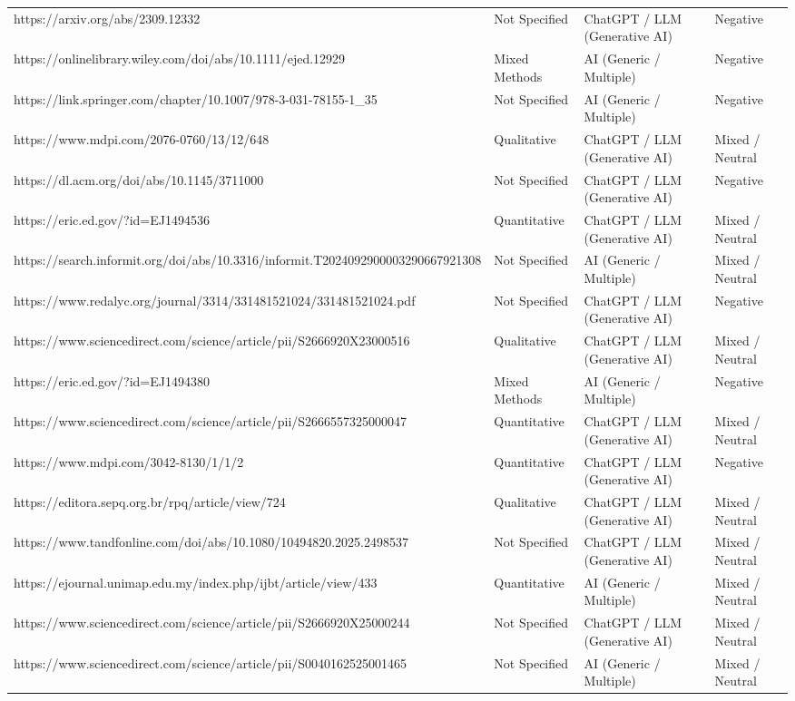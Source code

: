 \begin{table}[htbp]
\begin{tabularx}{\textwidth}{l l l X}
    https://arxiv.org/abs/2309.12332 & Not Specified & ChatGPT / LLM (Generative AI) & Negative \\
    https://onlinelibrary.wiley.com/doi/abs/10.1111/ejed.12929 & Mixed Methods & AI (Generic / Multiple) & Negative \\
    https://link.springer.com/chapter/10.1007/978-3-031-78155-1\_35 & Not Specified & AI (Generic / Multiple) & Negative \\
    https://www.mdpi.com/2076-0760/13/12/648 & Qualitative & ChatGPT / LLM (Generative AI) & Mixed / Neutral \\
    https://dl.acm.org/doi/abs/10.1145/3711000 & Not Specified & ChatGPT / LLM (Generative AI) & Negative \\
    https://eric.ed.gov/?id=EJ1494536 & Quantitative & ChatGPT / LLM (Generative AI) & Mixed / Neutral \\
    https://search.informit.org/doi/abs/10.3316/informit.T2024092900003290667921308 & Not Specified & AI (Generic / Multiple) & Mixed / Neutral \\
    https://www.redalyc.org/journal/3314/331481521024/331481521024.pdf & Not Specified & ChatGPT / LLM (Generative AI) & Negative \\
    https://www.sciencedirect.com/science/article/pii/S2666920X23000516 & Qualitative & ChatGPT / LLM (Generative AI) & Mixed / Neutral \\
    https://eric.ed.gov/?id=EJ1494380 & Mixed Methods & AI (Generic / Multiple) & Negative \\
    https://www.sciencedirect.com/science/article/pii/S2666557325000047 & Quantitative & ChatGPT / LLM (Generative AI) & Mixed / Neutral \\
    https://www.mdpi.com/3042-8130/1/1/2 & Quantitative & ChatGPT / LLM (Generative AI) & Negative \\
    https://editora.sepq.org.br/rpq/article/view/724 & Qualitative & ChatGPT / LLM (Generative AI) & Mixed / Neutral \\
    https://www.tandfonline.com/doi/abs/10.1080/10494820.2025.2498537 & Not Specified & ChatGPT / LLM (Generative AI) & Mixed / Neutral \\
    https://ejournal.unimap.edu.my/index.php/ijbt/article/view/433 & Quantitative & AI (Generic / Multiple) & Mixed / Neutral \\
    https://www.sciencedirect.com/science/article/pii/S2666920X25000244 & Not Specified & ChatGPT / LLM (Generative AI) & Mixed / Neutral \\
    https://www.sciencedirect.com/science/article/pii/S0040162525001465 & Not Specified & AI (Generic / Multiple) & Mixed / Neutral \\

\end{tabularx}
\end{table}
